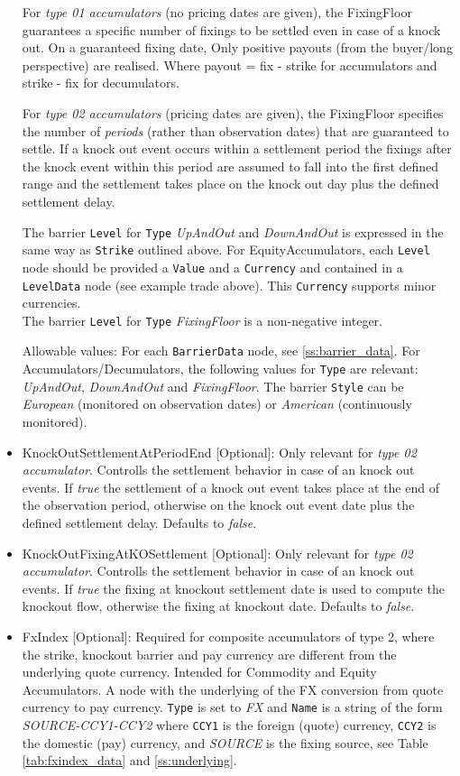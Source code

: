 \begin{itemize}
    For \emph{type 01 accumulators} (no pricing dates are given), the FixingFloor guarantees a specific number of
    fixings to be settled even in case of a knock out. On a guaranteed fixing date, Only positive payouts (from the
    buyer/long perspective) are realised. Where payout = fix - strike for accumulators and strike - fix for decumulators.

    For \emph{type 02 accumulators} (pricing dates are given), the FixingFloor specifies the number of {\em periods}
    (rather than observation dates) that are guaranteed to settle. If a knock out event occurs within a settlement
    period the fixings after the knock event within this period are assumed to fall into the first defined range and the
    settlement takes place on the knock out day plus the defined settlement delay.

    The barrier \lstinline!Level! for \lstinline!Type! \emph{UpAndOut} and \emph{DownAndOut} is expressed in the same way as \lstinline!Strike! outlined above. For EquityAccumulators, each \lstinline!Level! node should be provided a \lstinline!Value! and a \lstinline!Currency! and contained in a \lstinline!LevelData! node (see example trade above). This \lstinline!Currency! supports minor currencies. \\
    The barrier \lstinline!Level! for \lstinline!Type!  \emph{FixingFloor}  is a non-negative integer.

    Allowable values: For each \lstinline!BarrierData! node, see \ref{ss:barrier_data}. For Accumulators/Decumulators, the following values for \lstinline!Type! are relevant: \emph{UpAndOut}, \emph{DownAndOut} and \emph{FixingFloor}. The barrier \lstinline!Style! can be \emph{European} (monitored on observation dates) or \emph{American} (continuously monitored).
\item KnockOutSettlementAtPeriodEnd [Optional]: Only relevant for \emph{type 02 accumulator}. Controlls the settlement behavior in case of an knock out events. 
    If \emph{true} the settlement of a knock out event takes place at the end of the observation period, otherwise on the knock out event date plus the 
    defined settlement delay. Defaults to \emph{false}.
\item KnockOutFixingAtKOSettlement [Optional]: Only relevant for \emph{type 02 accumulator}. Controlls the settlement behavior in case of an knock out events. 
    If \emph{true} the fixing at knockout settlement date is used to compute the knockout flow, otherwise the fixing at knockout date. Defaults to \emph{false}.
\item FxIndex [Optional]: Required for composite accumulators of type 2, where the strike, knockout barrier and pay currency are different from the underlying quote currency. Intended for Commodity and Equity Accumulators. A node with the underlying of the FX conversion from quote currency to pay currency.
\lstinline!Type! is set to \emph{FX} and \lstinline!Name! is a string of the form \emph{SOURCE-CCY1-CCY2} where \lstinline!CCY1! is the foreign (quote) currency, \lstinline!CCY2! is the domestic (pay) currency, and \emph{SOURCE} is the fixing source, see Table \ref{tab:fxindex_data} and  \ref{ss:underlying}.
\end{itemize}

